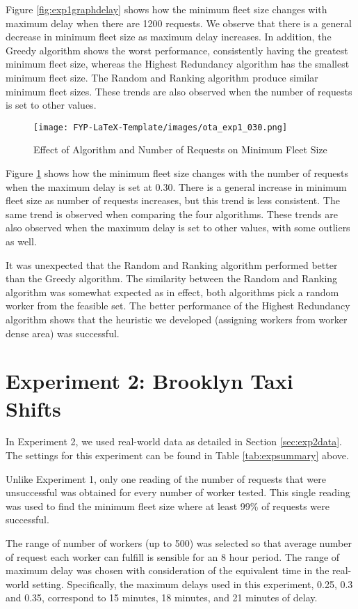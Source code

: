 \documentclass[urop]{socreport}
\begin{document}
Figure \ref{fig:exp1graphdelay} shows how the minimum fleet size changes with maximum delay when there are 1200 requests. We observe that there is a general decrease in minimum fleet size as maximum delay increases. In addition, the Greedy algorithm shows the worst performance, consistently having the greatest minimum fleet size, whereas the Highest Redundancy algorithm has the smallest minimum fleet size. The Random and Ranking algorithm produce similar minimum fleet sizes. These trends are also observed when the number of requests is set to other values.

\begin{figure}
    \centering
    \texttt{[image: FYP-LaTeX-Template/images/ota\_exp1\_030.png]}
    \caption{Effect of Algorithm and Number of Requests on Minimum Fleet Size}
    \label{fig:exp1graphnumreq}
\end{figure}

Figure \ref{fig:exp1graphnumreq} shows how the minimum fleet size changes with the number of requests when the maximum delay is set at 0.30. There is a general increase in minimum fleet size as number of requests increases, but this trend is less consistent. The same trend is observed when comparing the four algorithms. These trends are also observed when the maximum delay is set to other values, with some outliers as well.

It was unexpected that the Random and Ranking algorithm performed better than the Greedy algorithm. The similarity between the Random and Ranking algorithm was somewhat expected as in effect, both algorithms pick a random worker from the feasible set. The better performance of the Highest Redundancy algorithm shows that the heuristic we developed (assigning workers from worker dense area) was successful.

\section{Experiment 2: Brooklyn Taxi Shifts}
In Experiment 2, we used real-world data as detailed in Section \ref{sec:exp2data}. The settings for this experiment can be found in Table \ref{tab:expsummary} above.

Unlike Experiment 1, only one reading of the number of requests that were unsuccessful was obtained for every number of worker tested. This single reading was used to find the minimum fleet size where at least 99\% of requests were successful. 

The range of number of workers (up to 500) was selected so that average number of request each worker can fulfill is sensible for an 8 hour period. The range of maximum delay was chosen with consideration of the equivalent time in the real-world setting. Specifically, the maximum delays used in this experiment, 0.25, 0.3 and 0.35, correspond to 15 minutes, 18 minutes, and 21 minutes of delay.
\end{document}
